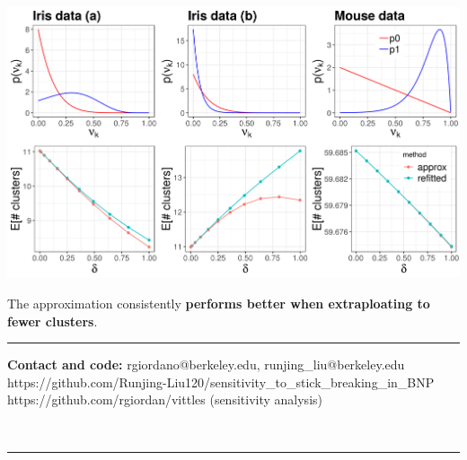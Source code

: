 \documentclass[a0,plainsections,30pt]{sciposter}\usepackage[]{graphicx}\usepackage[]{color}
\newenvironment{knitrout}{}{} %
\begin{document}
\begin{minipage}[t]{0.45\textwidth}
\begin{knitrout}
{\centering \includegraphics[width=0.98\linewidth,height=0.588\linewidth]{figure/functional_sens_plot-1} 

}



\end{knitrout}

The approximation consistently \textbf{performs better when extraploating to
fewer clusters}.

\noindent\rule{0.95\textwidth}{1pt}

{\bf Contact and code: } rgiordano@berkeley.edu, runjing\_liu@berkeley.edu
{\color{blue} https://github.com/Runjing-Liu120/sensitivity\_to\_stick\_breaking\_in\_BNP}
{\color{blue} https://github.com/rgiordan/vittles}
(sensitivity analysis)

% 

\end{minipage}\\

\begin{center}
\noindent\rule{0.95\textwidth}{1pt}
\end{center}


\renewcommand{\section}[2]{}%
\footnotesize{
  
  
}
\end{document}
